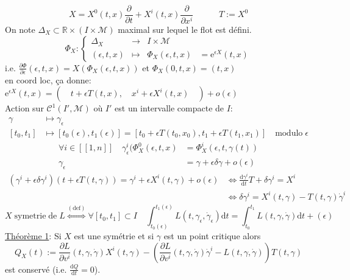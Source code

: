 \documentclass[a4paper,11pt]{article}
\renewcommand{\d}{{\mathrm{d}}}
\newcommand{\e}{{\mathrm{e}}}
\newcommand{\dr}[2]{\frac{\partial {#1}}{\partial{#2}}}
\begin{document}
$$X = X^0(t,x)\frac{\partial}{\partial t} + X^i(t,x) \frac{\partial}{\partial x^i} \quad \quad \quad T:=X^0$$
On note $\Delta_X\subset \mathbb{R}\times(I\times\mathcal{M})$ maximal sur lequel le flot est défini.
\begin{equation*}
	\Phi_X : \left\{\begin{matrix}
	\Delta_X & \to & I\times\mathcal{M} &\\
	(\epsilon,t,x) & \mapsto & \Phi_X(\epsilon,t,x) &=\e^{\epsilon X}(t,x)
	\end{matrix}\right.
\end{equation*}
i.e. $\frac{\partial \Phi}{\partial \epsilon}(\epsilon, t, x) = X(\Phi_X(\epsilon, t, x))$ et $\Phi_X(0,t,x)=(t,x)$
\\
en coord loc, ça donne: $\e^{\epsilon X}(t,x)=\left(\quad t+\epsilon T(t,x),\quad x^i+\epsilon X^i(t,x)\quad \right) + o(\epsilon)$
\\
Action sur $\mathcal{C}^1(I',\mathcal{M})$ où $I'$ est un intervalle compacte de $I$:
\begin{align*}
\gamma &\mapsto \gamma_\epsilon\\
[t_0,t_1] &\mapsto[t_0(\epsilon),t_1(\epsilon)]=[t_0+\epsilon T(t_0,x_0),t_1+\epsilon T(t_1,x_1)]\quad \mathrm{modulo}\;\epsilon
\end{align*}
\begin{align*}
\forall i \in [\![1,n]\!] \quad \gamma^i_{\epsilon}(\Phi_X^0(\epsilon,t,x) &= \Phi_X^i(\epsilon,t,\gamma(t))\\
\gamma_\epsilon &= \gamma + \epsilon\delta\gamma + o(\epsilon)
\end{align*}
\begin{align*}
(\gamma^i+\epsilon\delta\gamma^i)(t+\epsilon T(t,\gamma)) = \gamma^i + \epsilon X^i(t,\gamma) + o(\epsilon)
&\iff \frac{\d \gamma^i}{\d t}T + \delta\gamma^i = X^i\\
&\iff \boxed{\delta \gamma^i = X^i(t,\gamma) - T(t,\gamma)\dot\gamma^i}
\end{align*}
$$X \; \mathrm{symetrie}\;\mathrm{de}\;L \overset{(\mathrm{def})}{\iff} \forall [t_0,t_1]\subset I \quad \int_{t_0(\epsilon)}^{t_1(\epsilon)} L(t,\gamma_\epsilon, \dot\gamma_\epsilon)\d t = \int_{t_0}^{t_1} L(t,\gamma,\dot\gamma)\d t + (\epsilon)$$
\underline{Théorème 1}: Si $X$ est une symétrie et si $\gamma$ est un point critique alors
$$Q_X(t) := \dr{L}{v^i}(t,\gamma,\dot\gamma)X^i(t,\gamma) - \left(\dr{L}{v^i}(t,\gamma,\dot\gamma)\dot\gamma^i - L(t,\gamma,\dot\gamma)\right)T(t,\gamma)$$
est conservé (i.e. $\frac{\d Q}{\d t}=0$).\\
\end{document}
